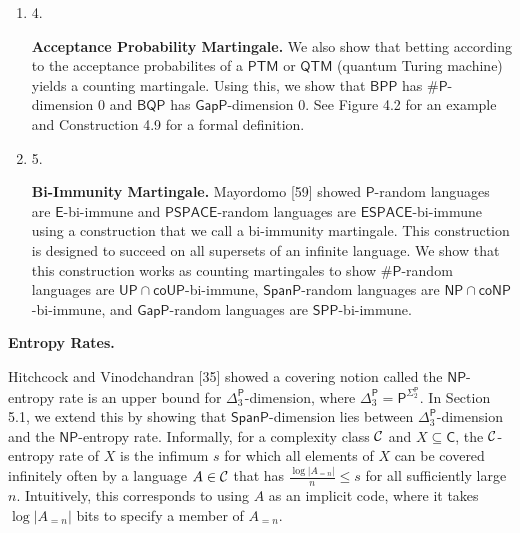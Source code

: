 \documentclass[10pt,a4paper]{article}
\begin{document}
\begin{enumerate}
\item[] 
4. 


\textbf{Acceptance Probability Martingale.}
We also show that betting according to the acceptance probabilites of a $\mathsf{PTM}$ or $\mathsf{QTM}$ (quantum Turing machine) yields a counting martingale. Using this, we show that $\mathsf{BPP}$ has ${\mathsf{\#}\mathsf{P}}$-dimension 0 and $\mathsf{BQP}$ has $\mathsf{GapP}$-dimension 0. See Figure 4.2 for an example and Construction 4.9 for a formal definition.\par





\item[] 
5. 


\textbf{Bi-Immunity Martingale.} Mayordomo [59] showed $\mathsf{P}$-random languages are $\mathsf{E}$-bi-immune and $\mathsf{PSPACE}$-random languages are $\mathsf{ESPACE}$-bi-immune using a construction that we call a bi-immunity martingale.
This construction is designed to succeed on all supersets of an infinite language. We show that this construction works as counting martingales to show ${\mathsf{\#}\mathsf{P}}$-random languages are $\mathsf{UP}\cap\mathsf{co}\mathsf{UP}$-bi-immune, $\mathsf{SpanP}$-random languages are $\mathsf{NP}\cap\mathsf{co}\mathsf{NP}$-bi-immune, and $\mathsf{GapP}$-random languages are $\mathsf{SPP}$-bi-immune.\par





\end{enumerate}




\par\medskip\noindent\textbf{Entropy Rates.}\par




Hitchcock and Vinodchandran [35] showed a covering notion called the $\mathsf{NP}$-entropy rate is an upper bound for ${\Delta^{\mathsf{P}}_{3}}$-dimension, where ${\Delta^{\mathsf{P}}_{3}}=\mathsf{P}^{{\Sigma^{\mathsf{P}}_{2}}}$. In Section 5.1, we extend this by showing that $\mathsf{SpanP}$-dimension lies between ${\Delta^{\mathsf{P}}_{3}}$-dimension and the $\mathsf{NP}$-entropy rate. Informally, for a complexity class ${\cal C}$ and $X\subseteq\mathsf{C}$, the ${\cal C}$-entropy rate of $X$ is the infimum $s$ for which all elements of $X$ can be covered infinitely often by a language $A\in{\cal C}$ that has $\frac{\log|A_{=n}|}{n}\leq s$ for all sufficiently large $n$. Intuitively, this corresponds to using $A$ as an implicit code, where it takes $\log|A_{=n}|$ bits to specify a member of $A_{=n}$.\par
\end{document}
